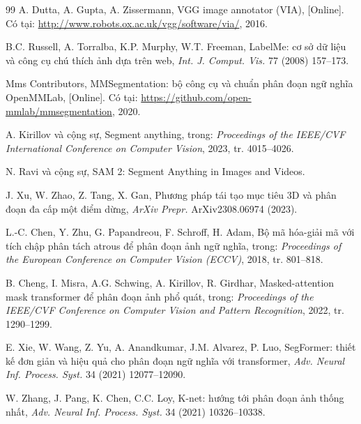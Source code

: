 \documentclass[12pt, a4paper]{article}
\begin{document}
\begin{thebibliography}{99}
A. Dutta, A. Gupta, A. Zissermann,
VGG image annotator (VIA),
[Online]. Có tại: \url{http://www.robots.ox.ac.uk/vgg/software/via/}, 2016.

B.C. Russell, A. Torralba, K.P. Murphy, W.T. Freeman,
LabelMe: cơ sở dữ liệu và công cụ chú thích ảnh dựa trên web,
\textit{Int. J. Comput. Vis.} 77 (2008) 157--173.

Mms Contributors,
MMSegmentation: bộ công cụ và chuẩn phân đoạn ngữ nghĩa OpenMMLab,
[Online]. Có tại: \url{https://github.com/open-mmlab/mmsegmentation}, 2020.

A. Kirillov và cộng sự,
Segment anything,
trong: \textit{Proceedings of the IEEE/CVF International Conference on Computer Vision},
2023, tr. 4015--4026.

N. Ravi và cộng sự,
SAM 2: Segment Anything in Images and Videos.

J. Xu, W. Zhao, Z. Tang, X. Gan,
Phương pháp tái tạo mục tiêu 3D và phân đoạn đa cấp một điểm dừng,
\textit{ArXiv Prepr.} ArXiv2308.06974 (2023).

L.-C. Chen, Y. Zhu, G. Papandreou, F. Schroff, H. Adam,
Bộ mã hóa-giải mã với tích chập phân tách atrous để phân đoạn ảnh ngữ nghĩa,
trong: \textit{Proceedings of the European Conference on Computer Vision (ECCV)},
2018, tr. 801--818.

B. Cheng, I. Misra, A.G. Schwing, A. Kirillov, R. Girdhar,
Masked-attention mask transformer để phân đoạn ảnh phổ quát,
trong: \textit{Proceedings of the IEEE/CVF Conference on Computer Vision and Pattern Recognition},
2022, tr. 1290--1299.

E. Xie, W. Wang, Z. Yu, A. Anandkumar, J.M. Alvarez, P. Luo,
SegFormer: thiết kế đơn giản và hiệu quả cho phân đoạn ngữ nghĩa với transformer,
\textit{Adv. Neural Inf. Process. Syst.} 34 (2021) 12077--12090.

W. Zhang, J. Pang, K. Chen, C.C. Loy,
K-net: hướng tới phân đoạn ảnh thống nhất,
\textit{Adv. Neural Inf. Process. Syst.} 34 (2021) 10326--10338.

\end{thebibliography}
\end{document}
